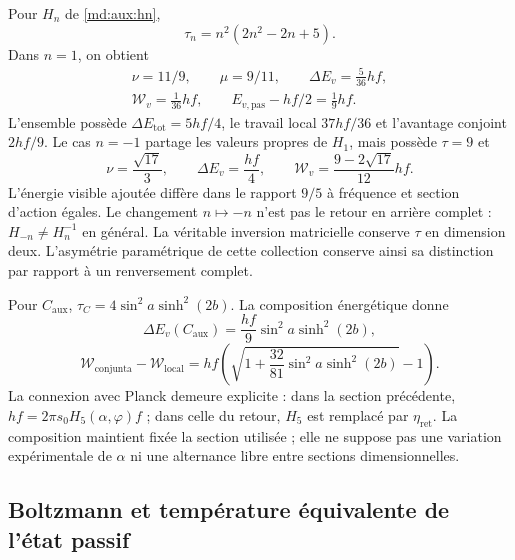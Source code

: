 Pour $H_n$ de \eqref{md:aux:hn},
\begin{equation}
 \tau_n=n^2(2n^2-2n+5).
 \label{md:aux:tau-hn}
\end{equation}
Dans $n=1$, on obtient
\begin{equation}
 \begin{gathered}
 \nu=11/9,\qquad\mu=9/11,\qquad
 \Delta E_v=\frac5{36}hf,\\
 \mathcal W_v=\frac1{36}hf,\qquad
 E_{v,\mathrm{pas}}-hf/2=\frac19hf.
 \end{gathered}
 \label{md:aux:caso-positivo}
\end{equation}
L’ensemble possède $\Delta E_{\mathrm{tot}}=5hf/4$, le travail
local $37hf/36$ et l’avantage conjoint $2hf/9$.
Le cas $n=-1$ partage les valeurs propres de $H_1$,
mais possède $\tau=9$ et
\begin{equation}
 \nu=\frac{\sqrt{17}}3,\qquad
 \Delta E_v=\frac{hf}{4},\qquad
 \mathcal W_v=\frac{9-2\sqrt{17}}{12}hf.
 \label{md:aux:caso-negativo}
\end{equation}
L’énergie visible ajoutée diffère dans le rapport $9/5$ à
fréquence et section d’action égales. Le changement $n\mapsto-n$
n’est pas le retour en arrière complet : $H_{-n}\ne H_n^{-1}$ en général.
La véritable inversion matricielle conserve $\tau$ en
dimension deux. L’asymétrie paramétrique de cette collection
conserve ainsi sa distinction par rapport à un renversement complet.

Pour $C_{\mathrm{aux}}$,
$\tau_C=4\sin^2a\sinh^2(2b)$. La composition énergétique donne
\begin{equation}
 \boxed{\Delta E_v(C_{\mathrm{aux}})
 =\frac{hf}{9}\sin^2a\sinh^2(2b),}
 \label{md:aux:energia-compensado}
\end{equation}
\begin{equation}
 \mathcal W_{\mathrm{conjunta}}-\mathcal W_{\mathrm{local}}
 =hf\left(\sqrt{1+\frac{32}{81}\sin^2a\sinh^2(2b)}-1\right).
 \label{md:aux:trabajo-compensado}
\end{equation}
La connexion avec Planck demeure explicite : dans la section
précédente, $hf=2\pi s_0H_5(\alpha,\varphi)f$ ; dans celle du retour,
$H_5$ est remplacé par $\eta_{\mathrm{ret}}$. La composition
maintient fixée la section utilisée ; elle ne suppose pas une
variation expérimentale de $\alpha$ ni une alternance libre
entre sections dimensionnelles.

\subsection{Boltzmann et température équivalente de l’état passif}
\label{md:aux:temperatura}


